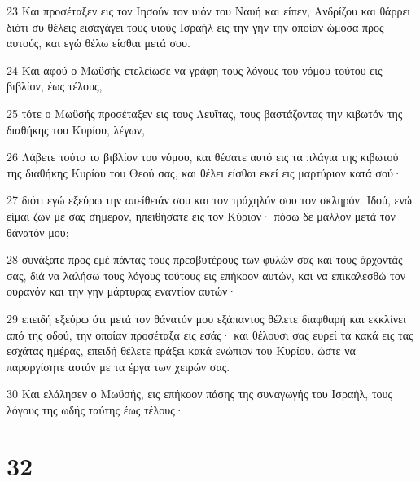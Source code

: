 \par 23 Και προσέταξεν εις τον Ιησούν τον υιόν του Ναυή και είπεν, Ανδρίζου και θάρρει διότι συ θέλεις εισαγάγει τους υιούς Ισραήλ εις την γην την οποίαν ώμοσα προς αυτούς, και εγώ θέλω είσθαι μετά σου.
\par 24 Και αφού ο Μωϋσής ετελείωσε να γράφη τους λόγους του νόμου τούτου εις βιβλίον, έως τέλους,
\par 25 τότε ο Μωϋσής προσέταξεν εις τους Λευΐτας, τους βαστάζοντας την κιβωτόν της διαθήκης του Κυρίου, λέγων,
\par 26 Λάβετε τούτο το βιβλίον του νόμου, και θέσατε αυτό εις τα πλάγια της κιβωτού της διαθήκης Κυρίου του Θεού σας, και θέλει είσθαι εκεί εις μαρτύριον κατά σού·
\par 27 διότι εγώ εξεύρω την απείθειάν σου και τον τράχηλόν σου τον σκληρόν. Ιδού, ενώ είμαι ζων με σας σήμερον, ηπειθήσατε εις τον Κύριον· πόσω δε μάλλον μετά τον θάνατόν μου;
\par 28 συνάξατε προς εμέ πάντας τους πρεσβυτέρους των φυλών σας και τους άρχοντάς σας, διά να λαλήσω τους λόγους τούτους εις επήκοον αυτών, και να επικαλεσθώ τον ουρανόν και την γην μάρτυρας εναντίον αυτών·
\par 29 επειδή εξεύρω ότι μετά τον θάνατόν μου εξάπαντος θέλετε διαφθαρή και εκκλίνει από της οδού, την οποίαν προσέταξα εις εσάς· και θέλουσι σας ευρεί τα κακά εις τας εσχάτας ημέρας, επειδή θέλετε πράξει κακά ενώπιον του Κυρίου, ώστε να παροργίσητε αυτόν με τα έργα των χειρών σας.
\par 30 Και ελάλησεν ο Μωϋσής, εις επήκοον πάσης της συναγωγής του Ισραήλ, τους λόγους της ωδής ταύτης έως τέλους·

\chapter{32}

